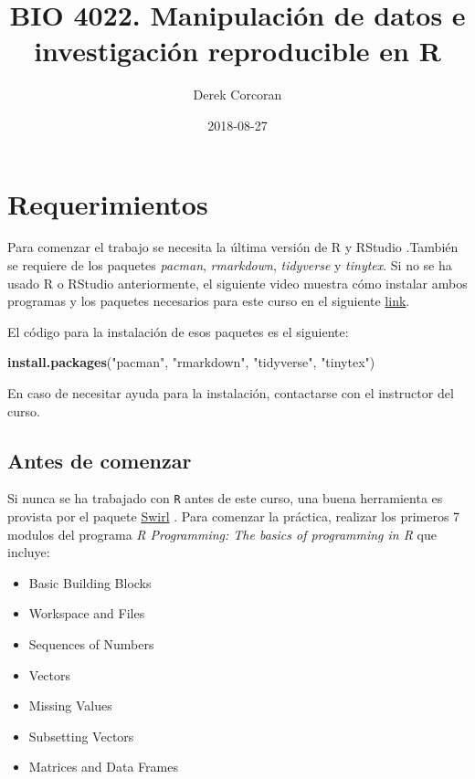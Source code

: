 \documentclass[]{book}
\title{BIO 4022. Manipulación de datos e investigación reproducible en R}
\author{Derek Corcoran}
\date{2018-08-27}
\newenvironment{Shaded}{\begin{snugshade}}{\end{snugshade}}
\newcommand{\KeywordTok}[1]{\textcolor[rgb]{0.13,0.29,0.53}{\textbf{#1}}}
\newcommand{\NormalTok}[1]{#1}
\newcommand{\StringTok}[1]{\textcolor[rgb]{0.31,0.60,0.02}{#1}}
\providecommand{\tightlist}{%
  \setlength{\itemsep}{0pt}\setlength{\parskip}{0pt}}
\begin{document}
\maketitle

{
\setcounter{tocdepth}{1}
\tableofcontents
}
\hypertarget{requerimientos}{%
\chapter*{Requerimientos}\label{requerimientos}}

Para comenzar el trabajo se necesita la última versión de R y RStudio
\citep{R-base}.También se requiere de los paquetes \emph{pacman},
\emph{rmarkdown}, \emph{tidyverse} y \emph{tinytex}. Si no se ha usado R
o RStudio anteriormente, el siguiente video muestra cómo instalar ambos
programas y los paquetes necesarios para este curso en el siguiente
\href{https://youtu.be/RtkCAKXsVbw}{link}.

El código para la instalación de esos paquetes es el siguiente:

\begin{Shaded}
\begin{Highlighting}[]
\KeywordTok{install.packages}\NormalTok{(}\StringTok{"pacman"}\NormalTok{, }\StringTok{"rmarkdown"}\NormalTok{, }\StringTok{"tidyverse"}\NormalTok{, }\StringTok{"tinytex"}\NormalTok{)}
\end{Highlighting}
\end{Shaded}

En caso de necesitar ayuda para la instalación, contactarse con el
instructor del curso.

\hypertarget{antes-de-comenzar}{%
\section{Antes de comenzar}\label{antes-de-comenzar}}

Si nunca se ha trabajado con \texttt{R} antes de este curso, una buena
herramienta es provista por el paquete
\href{http://swirlstats.com/students.html}{Swirl} \citep{Kross2017}.
Para comenzar la práctica, realizar los primeros 7 modulos del programa
\emph{R Programming: The basics of programming in R} que incluye:

\begin{itemize}
\tightlist
\item
  Basic Building Blocks
\item
  Workspace and Files
\item
  Sequences of Numbers
\item
  Vectors
\item
  Missing Values
\item
  Subsetting Vectors
\item
  Matrices and Data Frames
\end{itemize}
\end{document}
